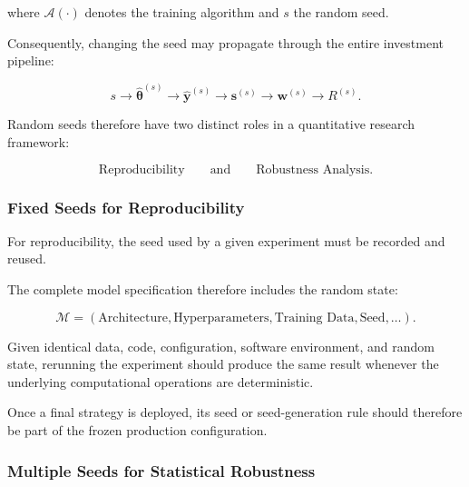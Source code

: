 \documentclass[11pt,a4paper]{article}
\begin{document}
where $\mathcal{A}(\cdot)$ denotes the training algorithm and $s$ the random
seed.

Consequently, changing the seed may propagate through the entire investment
pipeline:

\begin{equation}
\boxed{
s
\rightarrow
\widehat{\boldsymbol{\theta}}^{(s)}
\rightarrow
\widehat{\mathbf{y}}^{(s)}
\rightarrow
\mathbf{s}^{(s)}
\rightarrow
\mathbf{w}^{(s)}
\rightarrow
R^{(s)}.
}
\end{equation}

Random seeds therefore have two distinct roles in a quantitative research
framework:

\begin{equation}
\boxed{
\text{Reproducibility}
\qquad\text{and}\qquad
\text{Robustness Analysis}.
}
\end{equation}


\subsubsection{Fixed Seeds for Reproducibility}

For reproducibility, the seed used by a given experiment must be recorded and
reused.

The complete model specification therefore includes the random state:

\begin{equation}
\boxed{
\mathcal{M}
=
\left(
\text{Architecture},
\text{Hyperparameters},
\text{Training Data},
\text{Seed},
\ldots
\right).
}
\end{equation}

Given identical data, code, configuration, software environment, and random
state, rerunning the experiment should produce the same result whenever the
underlying computational operations are deterministic.

Once a final strategy is deployed, its seed or seed-generation rule should
therefore be part of the frozen production configuration.


\subsubsection{Multiple Seeds for Statistical Robustness}
\end{document}
